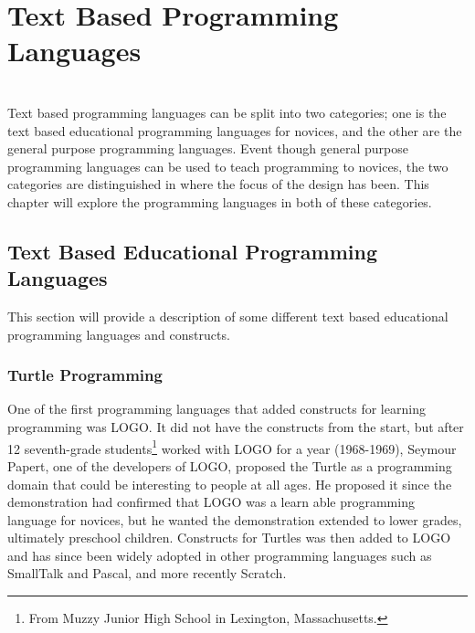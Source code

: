 \section{Text Based Programming Languages}
\label{sec:text_based_programming_languages}
\\
Text based programming languages can be split into two categories; one is the text based educational programming languages for novices, and the other are the general purpose programming languages. Event though general purpose programming languages can be used to teach programming to novices, the two categories are distinguished in where the focus of the design has been. This chapter will explore the programming languages in both of these categories.

\subsection{Text Based Educational Programming Languages}
This section will provide a description of some different text based educational programming languages and constructs.
\subsubsection{Turtle Programming}
One of the first programming languages that added constructs for learning programming was LOGO. It did not have the constructs from the start, but after 12 seventh-grade students\footnote{From Muzzy Junior High School in Lexington, Massachusetts.} worked with LOGO for a year (1968-1969), Seymour Papert, one of the developers of LOGO, proposed the Turtle as a programming domain that could be interesting to people at all ages. He proposed it since the demonstration had confirmed that LOGO was a learn able programming language for novices, but he wanted the demonstration extended to lower grades, ultimately preschool children. Constructs for Turtles was then added to LOGO and has since been widely adopted in other programming languages such as SmallTalk and Pascal, and more recently Scratch\cite{turtle_origin}.


